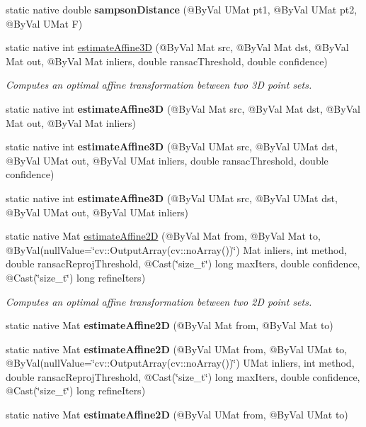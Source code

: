 \begin{DoxyCompactItemize}
static native double {\bfseries sampson\+Distance} (@By\+Val U\+Mat pt1, @By\+Val U\+Mat pt2, @By\+Val U\+Mat F)
\item 
static native int \hyperlink{group__calib3d_ga07eb86fa8ee181d1695f57b6b93955cd}{estimate\+Affine3D} (@By\+Val Mat src, @By\+Val Mat dst, @By\+Val Mat out, @By\+Val Mat inliers, double ransac\+Threshold, double confidence)
\begin{DoxyCompactList}\small\item\em Computes an optimal affine transformation between two 3D point sets. \end{DoxyCompactList}\item 
static native int {\bfseries estimate\+Affine3D} (@By\+Val Mat src, @By\+Val Mat dst, @By\+Val Mat out, @By\+Val Mat inliers)
\item 
static native int {\bfseries estimate\+Affine3D} (@By\+Val U\+Mat src, @By\+Val U\+Mat dst, @By\+Val U\+Mat out, @By\+Val U\+Mat inliers, double ransac\+Threshold, double confidence)
\item 
static native int {\bfseries estimate\+Affine3D} (@By\+Val U\+Mat src, @By\+Val U\+Mat dst, @By\+Val U\+Mat out, @By\+Val U\+Mat inliers)
\item 
static native Mat \hyperlink{group__calib3d_ga3ac5c98614a2c26448c68e407388473f}{estimate\+Affine2D} (@By\+Val Mat from, @By\+Val Mat to, @By\+Val(null\+Value=\char`\"{}cv\+::\+Output\+Array(cv\+::no\+Array())\char`\"{}) Mat inliers, int method, double ransac\+Reproj\+Threshold, @Cast(\char`\"{}size\+\_\+t\char`\"{}) long max\+Iters, double confidence, @Cast(\char`\"{}size\+\_\+t\char`\"{}) long refine\+Iters)
\begin{DoxyCompactList}\small\item\em Computes an optimal affine transformation between two 2D point sets. \end{DoxyCompactList}\item 
static native Mat {\bfseries estimate\+Affine2D} (@By\+Val Mat from, @By\+Val Mat to)
\item 
static native Mat {\bfseries estimate\+Affine2D} (@By\+Val U\+Mat from, @By\+Val U\+Mat to, @By\+Val(null\+Value=\char`\"{}cv\+::\+Output\+Array(cv\+::no\+Array())\char`\"{}) U\+Mat inliers, int method, double ransac\+Reproj\+Threshold, @Cast(\char`\"{}size\+\_\+t\char`\"{}) long max\+Iters, double confidence, @Cast(\char`\"{}size\+\_\+t\char`\"{}) long refine\+Iters)
\item 
static native Mat {\bfseries estimate\+Affine2D} (@By\+Val U\+Mat from, @By\+Val U\+Mat to)

\end{DoxyCompactItemize}
